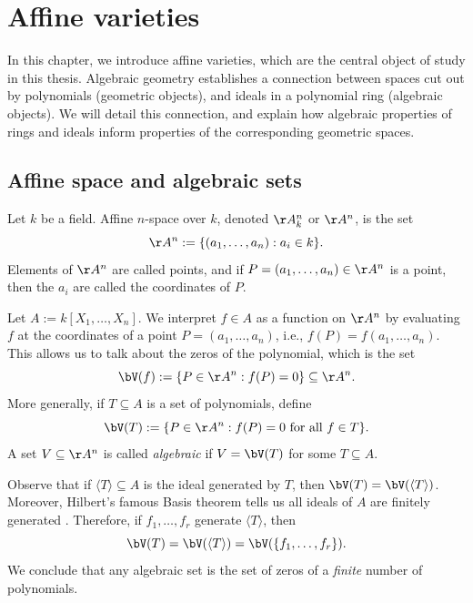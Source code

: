 \documentclass[12pt]{amsart}
\theoremstyle{plain}
\begin{document}
\newpage
\section{Affine varieties}
In this chapter, we introduce affine varieties, which are the central object of study in this thesis.
Algebraic geometry establishes a connection between spaces cut out by polynomials (geometric objects), and ideals in a polynomial ring (algebraic objects).
We will detail this connection, and explain how algebraic properties of rings and ideals inform properties of the corresponding geometric spaces.

\subsection{Affine space and algebraic sets}
Let $k$ be a field.
Affine $n$-space over $k$, denoted $\AA^n_k$ or $\AA^n$, is the set 
$$\AA^n := \{(a_1, \ldots, a_n) : a_i \in k\}.$$
Elements of $\AA^n$ are called points, and if $P = (a_1, \ldots, a_n) \in \AA^n$ is a point, then the $a_i$ are called the coordinates of $P$.

Let $A := k[X_1, \ldots, X_n]$.
We interpret $f \in A$ as a function on $\AA^n$ by evaluating $f$ at the coordinates of a point $P = (a_1, \ldots, a_n)$, i.e., $f(P) = f(a_1, \ldots, a_n).$
This allows us to talk about the zeros of the polynomial, which is the set
$$\bV(f) := \{P \in \AA^n : f(P) = 0\} \subseteq \AA^n.$$
More generally, if $T \subseteq A$ is a set of polynomials, define
$$\bV(T) := \{P \in \AA^n : f(P) = 0 \text{ for all } f \in T\}.$$
A set $V \subseteq \AA^n$ is called \emph{algebraic} if $V = \bV(T)$ for some $T \subseteq A$.

Observe that if $\langle T \rangle \subseteq A$ is the ideal generated by $T$, then $\bV(T) = \bV(\langle T \rangle)$.
Moreover, Hilbert's famous Basis theorem tells us all ideals of $A$ are finitely generated \cite[\S 3.6]{Reid95}.
Therefore, if $f_1, \ldots, f_r$ generate $\langle T \rangle$, then 
$$\bV(T) = \bV(\langle T \rangle) = \bV(\{f_1, \ldots, f_r\}).$$
We conclude that any algebraic set is the set of zeros of a \emph{finite} number of polynomials.
\end{document}
